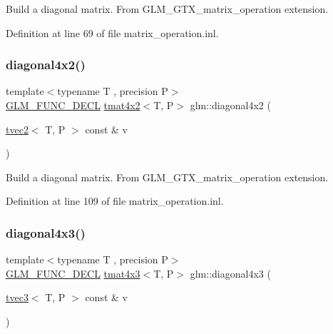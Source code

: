 Build a diagonal matrix. From G\+L\+M\+\_\+\+G\+T\+X\+\_\+matrix\+\_\+operation extension. 

Definition at line 69 of file matrix\+\_\+operation.\+inl.

\mbox{\label{group__gtx__matrix__operation_ga70cc5632aa9f41e7cf0b81fee6f2bfe6}} 
\subsubsection{\texorpdfstring{diagonal4x2()}{diagonal4x2()}}
{\footnotesize\ttfamily template$<$typename T , precision P$>$ \\
\mbox{\hyperlink{setup_8hpp_ab2d052de21a70539923e9bcbf6e83a51}{G\+L\+M\+\_\+\+F\+U\+N\+C\+\_\+\+D\+E\+CL}} \mbox{\hyperlink{structglm_1_1tmat4x2}{tmat4x2}}$<$T, P$>$ glm\+::diagonal4x2 (\begin{DoxyParamCaption}\item[{\mbox{\hyperlink{structglm_1_1tvec2}{tvec2}}$<$ T, P $>$ const \&}]{v }\end{DoxyParamCaption})}

Build a diagonal matrix. From G\+L\+M\+\_\+\+G\+T\+X\+\_\+matrix\+\_\+operation extension. 

Definition at line 109 of file matrix\+\_\+operation.\+inl.

\mbox{\label{group__gtx__matrix__operation_ga4242ea5681f81539e0c5b54fadcd9ddf}} 
\subsubsection{\texorpdfstring{diagonal4x3()}{diagonal4x3()}}
{\footnotesize\ttfamily template$<$typename T , precision P$>$ \\
\mbox{\hyperlink{setup_8hpp_ab2d052de21a70539923e9bcbf6e83a51}{G\+L\+M\+\_\+\+F\+U\+N\+C\+\_\+\+D\+E\+CL}} \mbox{\hyperlink{structglm_1_1tmat4x3}{tmat4x3}}$<$T, P$>$ glm\+::diagonal4x3 (\begin{DoxyParamCaption}\item[{\mbox{\hyperlink{structglm_1_1tvec3}{tvec3}}$<$ T, P $>$ const \&}]{v }\end{DoxyParamCaption})}

